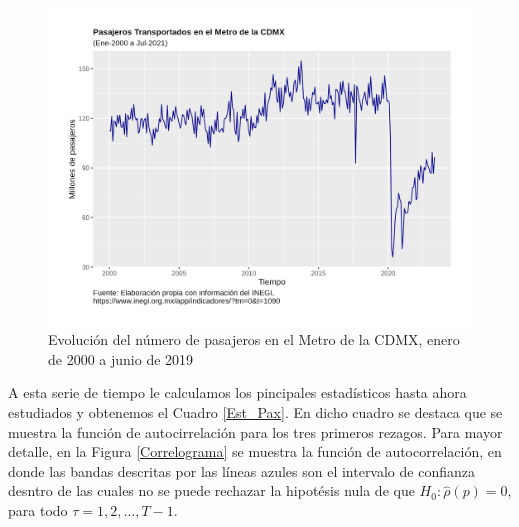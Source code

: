 \documentclass[
  a4paper,
]{article}
\begin{document}
\begin{figure}
  \centering
  \includegraphics[width=1.0\textwidth]{Pax_Metro}
  \caption{Evolución del número de pasajeros en el Metro de la CDMX, enero de 2000 a junio de 2019}
  \label{Pax_Metro}
\end{figure}

A esta serie de tiempo le calculamos los pincipales estadísticos hasta
ahora estudiados y obtenemos el Cuadro \ref{Est_Pax}. En dicho cuadro se
destaca que se muestra la función de autocirrelación para los tres
primeros rezagos. Para mayor detalle, en la Figura \ref{Correlograma} se
muestra la función de autocorrelación, en donde las bandas descritas por
las líneas azules son el intervalo de confianza desntro de las cuales no
se puede rechazar la hipotésis nula de que \(H_0: \hat{\rho}(p) = 0\),
para todo \(\tau = 1, 2, \ldots, T-1\).
\end{document}
